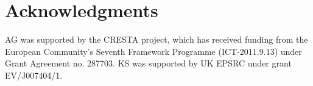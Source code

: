 %






\section*{Acknowledgments}
AG was supported by the CRESTA project, which has received
funding from the European Community's Seventh Framework Programme
(ICT-2011.9.13) under Grant Agreement no. 287703. KS was supported
by UK EPSRC under grant EV/J007404/1.




%
%
%


